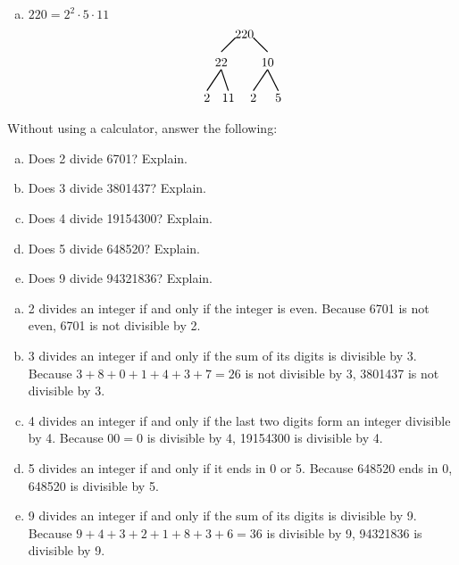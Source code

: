 \documentclass[11pt,letterpaper]{article}
\begin{document}
\begin{enumerate}[(a)]
\item $220= 2^2 \cdot 5 \cdot 11$
	\[
	\begin{tikzpicture}
	\node at (-0.15,0) {$220$};
	\draw[line width=0.03cm] (-0.4,-0.1) -- (-0.8,-0.5);
	\node at (-0.8,-0.8) {$22$};
	\draw[line width=0.03cm]  (0.1,-0.1) -- (0.5,-0.5);
	\node at (0.5,-0.8) {$10$};
		
	\draw[line width=0.03cm] (-0.8,-1) -- (-1.2,-1.6);
	\node at (-1.2,-1.8) {$2$};
	\draw[line width=0.03cm] (-0.8,-1) -- (-0.6,-1.6);
	\node at (-0.6,-1.8) {$11$};
	
	\draw[line width=0.03cm] (0.5,-1) -- (0.1,-1.6);
	\node at (0.1,-1.8) {$2$};
	\draw[line width=0.03cm] (0.5,-1) -- (0.8,-1.6);
	\node at (0.8,-1.8) {$5$};
	\end{tikzpicture}
	\] 
\end{enumerate}



\newpage



 Without using a calculator, answer the following:
	\begin{enumerate}[(a)]
	\item Does 2 divide 6701? Explain.
	\item Does 3 divide 3801437? Explain.
	\item Does 4 divide 19154300? Explain.
	\item Does 5 divide 648520? Explain.
	\item Does 9 divide 94321836? Explain. 
	\end{enumerate} \pspace

\sol
\begin{enumerate}[(a)]
\item 2 divides an integer if and only if the integer is even. Because 6701 is not even, 6701 is not divisible by 2. \pspace

\item 3 divides an integer if and only if the sum of its digits is divisible by 3. Because $3 + 8 + 0 + 1 + 4 + 3 + 7= 26$ is not divisible by 3, 3801437 is not divisible by 3. \pspace

\item 4 divides an integer if and only if the last two digits form an integer divisible by 4. Because $00= 0$ is divisible by 4, 19154300 is divisible by 4. \pspace

\item 5 divides an integer if and only if it ends in 0 or 5. Because 648520 ends in 0, 648520 is divisible by 5. \pspace

\item 9 divides an integer if and only if the sum of its digits is divisible by 9. Because $9 + 4 + 3 + 2 + 1 + 8 + 3 + 6= 36$ is divisible by 9, 94321836 is divisible by 9. 
\end{enumerate}
\end{document}
